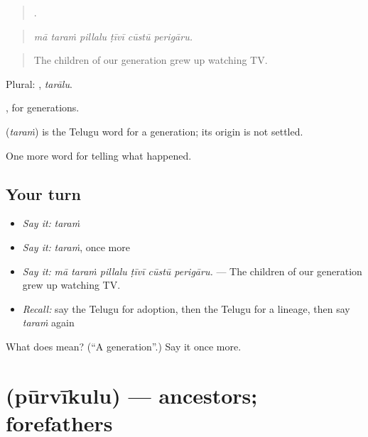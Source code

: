 \begin{quote}
     .
\end{quote}

\begin{quote}
\emph{mā taraṁ pillalu ṭīvī cūstū perigāru.}
\end{quote}

\begin{quote}
The children of our generation grew up watching TV.
\end{quote}

Plural: , \emph{tarālu}.

, for generations.

\begin{cousinweb}
\textbf{} (\emph{taraṁ}) is the Telugu word for a generation; its origin is not settled.
\end{cousinweb}

\begin{grammarlens}[title={What you've built}]
One more word for telling what happened.
\end{grammarlens}

\subsection*{Your turn}
\begin{itemize}
\raggedright
  \item \emph{Say it:} \emph{taraṁ}
  \item \emph{Say it:} \emph{taraṁ}, once more
  \item \emph{Say it:} \emph{mā taraṁ pillalu ṭīvī cūstū perigāru.} — The children of our generation grew up watching TV.
  \item \emph{Recall:} say the Telugu for adoption, then the Telugu for a lineage, then say \emph{taraṁ} again
\end{itemize}

\begin{tcolorbox}[breakable,colback=teal!4,colframe=teal!35!black,title={Before you move on}]
What does  mean? (\textquotedblleft{}A generation\textquotedblright{}.) Say it once more.
\end{tcolorbox}
\section[\texorpdfstring{\te{పూర్వీకులు} (pūrvīkulu)}{పూర్వీకులు (pūrvīkulu)}]{ (pūrvīkulu) — ancestors; forefathers}

